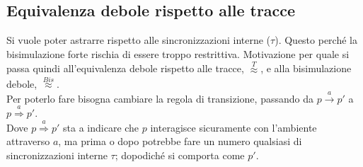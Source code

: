 \subsection{Equivalenza debole rispetto alle tracce}
Si vuole poter astrarre rispetto alle sincronizzazioni interne ($\tau$). Questo perché la bisimulazione forte rischia di essere troppo restrittiva. Motivazione per quale si passa quindi all’equivalenza debole rispetto alle tracce, $\stackrel{T}{\approx}$, e alla bisimulazione debole, $\stackrel{Bis}{\approx}$.\\
Per poterlo fare bisogna cambiare la regola di transizione, passando da $p\stackrel{a}{\rightarrow}p'$ a $p\stackrel{a}{\Rightarrow}p'$. \\
Dove $p\stackrel{a}{\Rightarrow}p'$ sta a indicare che $p$ interagisce sicuramente con l’ambiente attraverso $a$, ma prima o dopo potrebbe fare un numero qualsiasi di sincronizzazioni interne $\tau$; dopodiché si comporta come $p'$.
